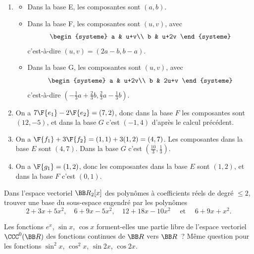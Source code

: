 \documentclass[12pt,french,oneside,a4paper]{memoir} %
\begin{document}
\begin{exo}
\begin{correction}
  \begin{enumerate}
  \item
    \begin{itemize}
    \item Dans la base E, les composantes sont $(a,b)$.
    \item Dans la base F, les composantes sont $(u,v)$, avec 
      \begin{equation*}
        \begin{systeme}
          a & u+v\\ b & u+2v
        \end{systeme}
      \end{equation*}
      c'est-à-dire $(u,v) = (2a-b,b-a)$.
    \item Dans la base G, les composantes sont $(u,v)$, avec
      \begin{equation*}
        \begin{systeme}
          a & u+2v\\ 
          b & 2u+v
        \end{systeme}
      \end{equation*}
      c'est-à-dire $(-\frac 13 a + \frac 23 b, \frac 23 a - \frac13 b)$.
    \end{itemize}
  \item On a $7 \F{e_1}-2 \F{e_2} = (7,2)$, donc dans la base $F$ les composantes sont $(12, -5)$, et dans la base $G$ c'est $(-1,4)$ d'après le calcul précédent.
  \item On a $\F{f_1}+3 \F{f_2} = (1,1) + 3(1,2) = (4,7)$. Les composantes dans la base $E$ sont $(4,7)$. Dans la base $G$ c'est $(\frac{10}{3},\frac 13)$.
  \item On a $\F{g_1} = (1,2)$, donc les composantes dans la base $E$ sont $(1,2)$, et dans la base $F$ c'est $(0,1)$.
  \end{enumerate}
\end{correction}
\end{exo}
\begin{exo}
Dans l'espace vectoriel ${\BB R}_2[x]$ des polynômes à coefficients réels de degré $\leq 2$, trouver une base du sous-espace engendré par les polynômes
\begin{equation*}
2+3x+5x^2, \quad 6+9x-5x^2, \quad 12+18x-10x^2 \quad \mbox{ et } \quad 6+9x+x^2.
\end{equation*}
\end{exo}
\begin{exo}
Les fonctions $e^x$, $\sin x$, $\cos x$ forment-elles une partie 
libre de l'espace vectoriel $\CCC^0({\BB R})$ des fonctions continues de ${\BB R}$
vers ${\BB R}$~? Même question pour les fonctions $\sin^2 x$, 
$\cos^2 x$, $\sin 2x$, $\cos 2x$.
\end{exo}
\end{document}

